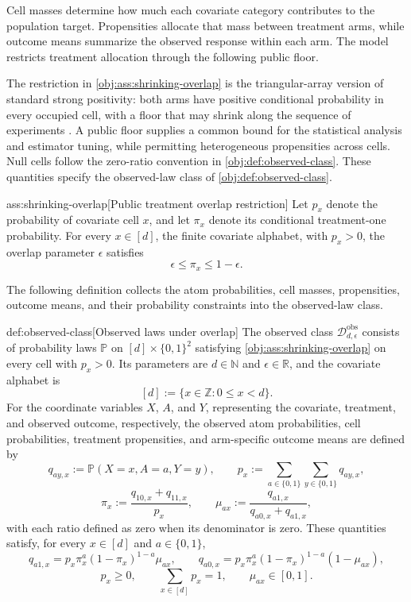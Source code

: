 Cell masses determine how much each covariate category contributes to the population target. Propensities allocate that mass between treatment arms, while outcome means summarize the observed response within each arm. The model restricts treatment allocation through the following public floor.

The restriction in \cref{obj:ass:shrinking-overlap} is the triangular-array version of standard strong positivity: both arms have positive conditional probability in every occupied cell, with a floor that may shrink along the sequence of experiments \citep{ZengBalakrishnanHanKennedy2024Discrete}. A public floor supplies a common bound for the statistical analysis and estimator tuning, while permitting heterogeneous propensities across cells. Null cells follow the zero-ratio convention in \cref{obj:def:observed-class}. These quantities specify the observed-law class  of \cref{obj:def:observed-class}.

\begin{assumptionv}{ass:shrinking-overlap}[Public treatment overlap restriction]
Let \(p_x\) denote the probability of covariate cell \(x\), and let \(\pi_x\) denote its conditional treatment-one probability. For every \(x\in[d]\), the finite covariate alphabet, with \(p_x>0\), the overlap parameter \(\epsilon\) satisfies
\[
\epsilon\le\pi_x\le1-\epsilon.
\]
\end{assumptionv}

The following definition collects the atom probabilities, cell masses, propensities, outcome means, and their probability constraints into the observed-law class.

\begin{definitionv}{def:observed-class}[Observed laws under overlap]
The observed class \(\mathcal D_{d,\epsilon}^{\mathrm{obs}}\) consists of probability laws \(\mathbb P\) on \([d]\times\{0,1\}^2\) satisfying \cref{obj:ass:shrinking-overlap} on every cell with \(p_x>0\). Its parameters are \(d\in\mathbb N\) and \(\epsilon\in\mathbb R\), and the covariate alphabet is
\[
[d]:=\{x\in\mathbb Z:0\le x<d\}.
\]
For the coordinate variables \(X\), \(A\), and \(Y\), representing the covariate, treatment, and observed outcome, respectively, the observed atom probabilities, cell probabilities, treatment propensities, and arm-specific outcome means are defined by
\[
q_{ay,x}:=\mathbb P(X=x,A=a,Y=y),
\qquad
p_x:=\sum_{a\in\{0,1\}}\sum_{y\in\{0,1\}}q_{ay,x},
\]
\[
\pi_x:=\frac{q_{10,x}+q_{11,x}}{p_x},
\qquad
\mu_{ax}:=\frac{q_{a1,x}}{q_{a0,x}+q_{a1,x}},
\]
with each ratio defined as zero when its denominator is zero. These quantities satisfy, for every \(x\in[d]\) and \(a\in\{0,1\}\),
\[
q_{a1,x}=p_x\pi_x^a(1-\pi_x)^{1-a}\mu_{ax},
\qquad
q_{a0,x}=p_x\pi_x^a(1-\pi_x)^{1-a}(1-\mu_{ax}),
\]
\[
p_x\ge0,
\qquad
\sum_{x\in[d]}p_x=1,
\qquad
\mu_{ax}\in[0,1].
\]
\end{definitionv}

